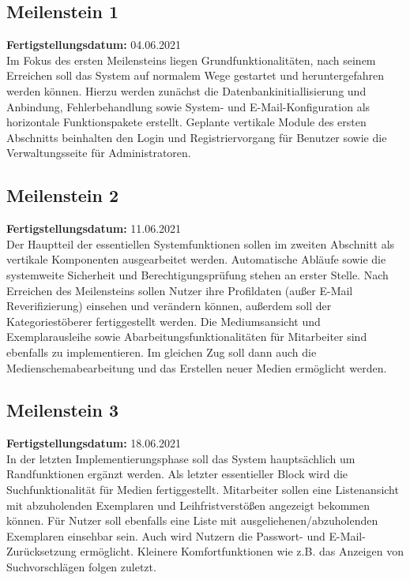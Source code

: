 \documentclass{article}
\begin{document}
\subsection{Meilenstein 1}
\textbf{Fertigstellungsdatum:} 04.06.2021 \\
Im Fokus des ersten Meilensteins liegen Grundfunktionalitäten, nach seinem Erreichen soll das System auf normalem Wege gestartet und heruntergefahren werden können. Hierzu werden zunächst die Datenbankinitiallisierung und Anbindung, Fehlerbehandlung sowie System- und E-Mail-Konfiguration als horizontale Funktionspakete erstellt. Geplante vertikale Module des ersten Abschnitts beinhalten den Login und Registriervorgang für Benutzer sowie die Verwaltungsseite für Administratoren.
\subsection{Meilenstein 2}
\textbf{Fertigstellungsdatum:} 11.06.2021 \\
Der Hauptteil der essentiellen Systemfunktionen sollen im zweiten Abschnitt als vertikale Komponenten ausgearbeitet werden. Automatische Abläufe sowie die systemweite Sicherheit und Berechtigungsprüfung stehen an erster Stelle. Nach Erreichen des Meilensteins sollen Nutzer ihre Profildaten (außer E-Mail Reverifizierung) einsehen und verändern können, außerdem soll der Kategoriestöberer fertiggestellt werden. Die Mediumsansicht und Exemplarausleihe sowie Abarbeitungsfunktionalitäten für Mitarbeiter sind ebenfalls zu implementieren. Im gleichen Zug soll dann auch die Medienschemabearbeitung und das Erstellen neuer Medien ermöglicht werden.
\subsection{Meilenstein 3}
\textbf{Fertigstellungsdatum:} 18.06.2021 \\
In der letzten Implementierungsphase soll das System hauptsächlich um Randfunktionen ergänzt werden. Als letzter essentieller Block wird die Suchfunktionalität für Medien fertiggestellt. Mitarbeiter sollen eine Listenansicht mit abzuholenden Exemplaren und Leihfristverstößen angezeigt bekommen können. Für Nutzer soll ebenfalls eine Liste mit ausgeliehenen/abzuholenden Exemplaren einsehbar sein. Auch wird Nutzern die Passwort- und E-Mail-Zurücksetzung ermöglicht. Kleinere Komfortfunktionen wie z.B. das Anzeigen von Suchvorschlägen folgen zuletzt.

\end{document}
